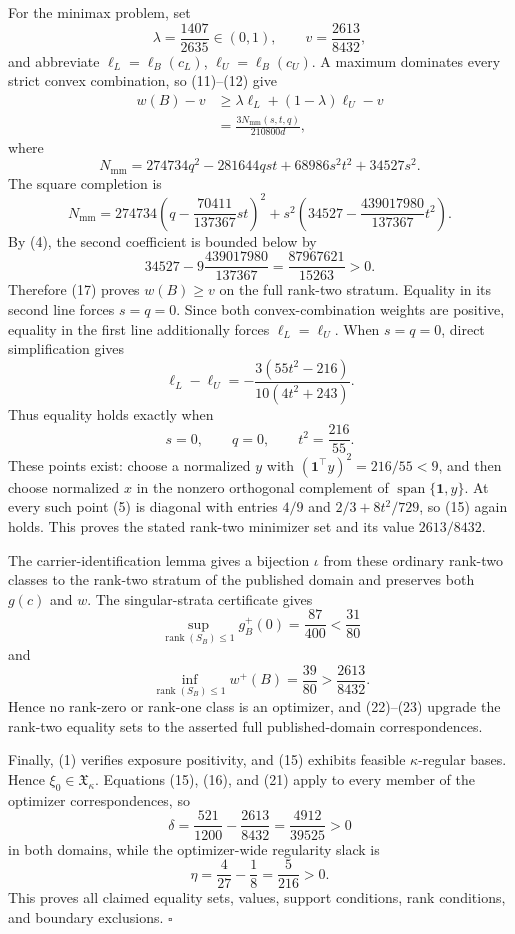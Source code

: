 For the minimax problem, set
\[
\lambda=\frac{1407}{2635}\in(0,1),
\qquad
v=\frac{2613}{8432},
\]
and abbreviate \(\ell_L=\ell_B(c_L)\), \(\ell_U=\ell_B(c_U)\).  A maximum dominates every strict convex combination, so (11)--(12) give
\[
\begin{split}
w(B)-v
&\ge\lambda\ell_L+(1-\lambda)\ell_U-v\\
&=\frac{3N_{\mathrm{mm}}(s,t,q)}{210800d},
\end{split}
\tag{17}
\]
where
\[
N_{\mathrm{mm}}
=274734q^2-281644qst+68986s^2t^2+34527s^2.
\]
The square completion is
\[
N_{\mathrm{mm}}
=274734\left(q-\frac{70411}{137367}st\right)^2
+s^2\left(34527-\frac{439017980}{137367}t^2\right).
\tag{18}
\]
By (4), the second coefficient is bounded below by
\[
34527-9\frac{439017980}{137367}
=\frac{87967621}{15263}>0.
\tag{19}
\]
Therefore (17) proves \(w(B)\ge v\) on the full rank-two stratum.  Equality in its second line forces \(s=q=0\).  Since both convex-combination weights are positive, equality in the first line additionally forces \(\ell_L=\ell_U\).  When \(s=q=0\), direct simplification gives
\[
\ell_L-\ell_U
=-\frac{3(55t^2-216)}{10(4t^2+243)}.
\tag{20}
\]
Thus equality holds exactly when
\[
s=0,
\qquad q=0,
\qquad t^2=\frac{216}{55}.
\tag{21}
\]
These points exist: choose a normalized \(y\) with \((\mathbf1^{\top}y)^2=216/55<9\), and then choose normalized \(x\) in the nonzero orthogonal complement of \(\operatorname{span}\{\mathbf1,y\}\).  At every such point (5) is diagonal with entries \(4/9\) and \(2/3+8t^2/729\), so (15) again holds.  This proves the stated rank-two minimizer set and its value \(2613/8432\).

The carrier-identification lemma gives a bijection \(\iota\) from these ordinary rank-two classes to the rank-two stratum of the published domain and preserves both \(g(c)\) and \(w\).  The singular-strata certificate gives
\[
\sup_{\operatorname{rank}(S_B)\le1}g_B^+(0)
=\frac{87}{400}<\frac{31}{80}
\tag{22}
\]
and
\[
\inf_{\operatorname{rank}(S_B)\le1}w^+(B)
=\frac{39}{80}>\frac{2613}{8432}.
\tag{23}
\]
Hence no rank-zero or rank-one class is an optimizer, and (22)--(23) upgrade the rank-two equality sets to the asserted full published-domain correspondences.

Finally, (1) verifies exposure positivity, and (15) exhibits feasible \(\kappa\)-regular bases.  Hence \(\xi_0\in\mathfrak X_\kappa\).  Equations (15), (16), and (21) apply to every member of the optimizer correspondences, so
\[
\delta
=\frac{521}{1200}-\frac{2613}{8432}
=\frac{4912}{39525}>0
\]
in both domains, while the optimizer-wide regularity slack is
\[
\eta=\frac4{27}-\frac18=\frac5{216}>0.
\]
This proves all claimed equality sets, values, support conditions, rank conditions, and boundary exclusions. \(\square\)